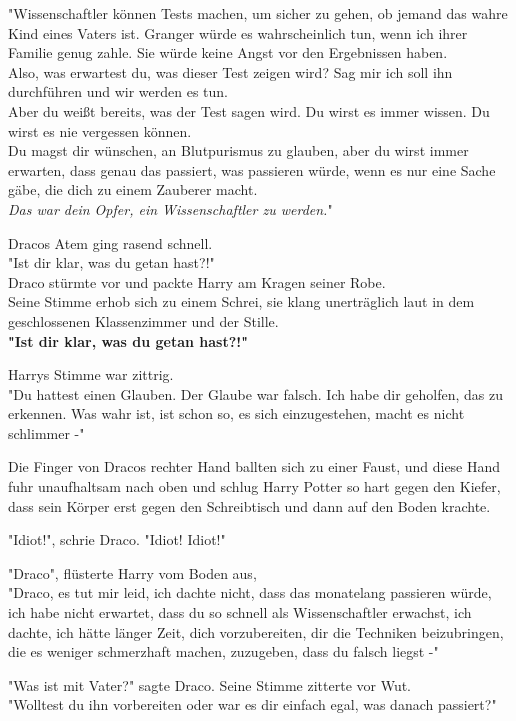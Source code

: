 {"Wissenschaftler können Tests machen, um sicher zu gehen, ob jemand das wahre Kind eines Vaters ist. Granger würde es wahrscheinlich tun, wenn ich ihrer Familie genug zahle. Sie würde keine Angst vor den Ergebnissen haben.\\ Also, was erwartest du, was dieser Test zeigen wird? Sag mir ich soll ihn durchführen und wir werden es tun.\\ Aber du weißt bereits, was der Test sagen wird. Du wirst es immer wissen. Du wirst es nie vergessen können.\\ Du magst dir wünschen, an Blutpurismus zu glauben, aber du wirst immer erwarten, dass genau das passiert, was passieren würde, wenn es nur eine Sache gäbe, die dich zu einem Zauberer macht.\\ \emph{Das war dein Opfer, ein Wissenschaftler zu werden.}"

Dracos Atem ging rasend schnell.\\ "Ist dir klar, was du getan hast?!"\\ Draco stürmte vor und packte Harry am Kragen seiner Robe.\\ Seine Stimme erhob sich zu einem Schrei, sie klang unerträglich laut in dem geschlossenen Klassenzimmer und der Stille.\\ \textbf{"Ist dir klar, was du getan hast?!"}

Harrys Stimme war zittrig.\\ "Du hattest einen Glauben. Der Glaube war falsch. Ich habe dir geholfen, das zu erkennen. Was wahr ist, ist schon so, es sich einzugestehen, macht es nicht schlimmer -"

Die Finger von Dracos rechter Hand ballten sich zu einer Faust, und diese Hand fuhr unaufhaltsam nach oben und schlug Harry Potter so hart gegen den Kiefer, dass sein Körper erst gegen den Schreibtisch und dann auf den Boden krachte.

"Idiot!", schrie Draco. "Idiot! Idiot!"

"Draco", flüsterte Harry vom Boden aus,\\ "Draco, es tut mir leid, ich dachte nicht, dass das monatelang passieren würde, ich habe nicht erwartet, dass du so schnell als Wissenschaftler erwachst, ich dachte, ich hätte länger Zeit, dich vorzubereiten, dir die Techniken beizubringen, die es weniger schmerzhaft machen, zuzugeben, dass du falsch liegst -"

"Was ist mit Vater?" sagte Draco. Seine Stimme zitterte vor Wut.\\ "Wolltest du ihn vorbereiten oder war es dir einfach egal, was danach passiert?"

}
